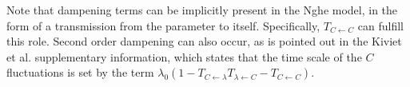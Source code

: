 Note that dampening terms can be implicitly present in the Nghe model, in the form of a transmission from the parameter to itself.
Specifically, $T_{C \leftarrow C}$ can fulfill this role. %
Second order dampening can also occur, 
as is pointed out in the Kiviet et al. supplementary information, which states that the time scale of the $C$ fluctuations is set by the term $\lambda_0(1-T_{C \leftarrow \lambda}T_{\lambda \leftarrow C}-T_{C \leftarrow C})$.






